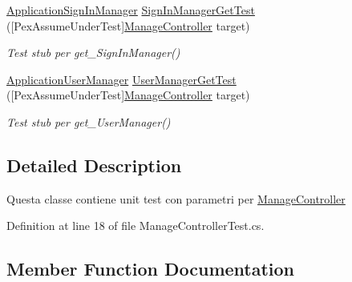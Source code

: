 \begin{DoxyCompactItemize}
\mbox{\hyperlink{class_brew_day2_1_1_application_sign_in_manager}{Application\+Sign\+In\+Manager}} \mbox{\hyperlink{class_brew_day2_1_1_controllers_1_1_tests_1_1_manage_controller_test_a27b931bd00549a3d9bd41765e4f1cbde}{Sign\+In\+Manager\+Get\+Test}} (\mbox{[}Pex\+Assume\+Under\+Test\mbox{]}\mbox{\hyperlink{class_brew_day2_1_1_controllers_1_1_manage_controller}{Manage\+Controller}} target)
\begin{DoxyCompactList}\small\item\em Test stub per get\+\_\+\+Sign\+In\+Manager()\end{DoxyCompactList}\item 
\mbox{\hyperlink{class_brew_day2_1_1_application_user_manager}{Application\+User\+Manager}} \mbox{\hyperlink{class_brew_day2_1_1_controllers_1_1_tests_1_1_manage_controller_test_a841d29dfeec1cb5ce8819476e2318e8e}{User\+Manager\+Get\+Test}} (\mbox{[}Pex\+Assume\+Under\+Test\mbox{]}\mbox{\hyperlink{class_brew_day2_1_1_controllers_1_1_manage_controller}{Manage\+Controller}} target)
\begin{DoxyCompactList}\small\item\em Test stub per get\+\_\+\+User\+Manager()\end{DoxyCompactList}\end{DoxyCompactItemize}


\subsection{Detailed Description}
Questa classe contiene unit test con parametri per \mbox{\hyperlink{class_brew_day2_1_1_controllers_1_1_manage_controller}{Manage\+Controller}}



Definition at line 18 of file Manage\+Controller\+Test.\+cs.



\subsection{Member Function Documentation}
\mbox{\label{class_brew_day2_1_1_controllers_1_1_tests_1_1_manage_controller_test_aa20e35ce79334dab1658147186261702}} 
